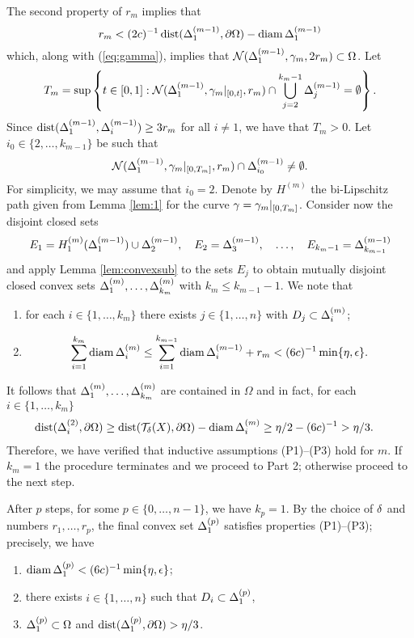 \documentclass{amsart}
\DeclareMathOperator{\dist}{dist}
\begin{document}
The second property of $r_m$ implies that 
\[ r_m <(2c)^{-1}\dist(\D^{(m-1)}_{1},\partial\Omega) - \diam{\D^{(m-1)}_{1}}\]
which, along with (\ref{eq:gamma}), implies that $\mathcal{N}(\Delta_{1}^{(m-1)},\gamma_m,2r_m) \subset \Omega$. 
Let
\[T_m = \sup\left \{ t \in [0,1] : \mathcal{N}(\Delta_{1}^{(m-1)},\gamma_m|_{[0,t]},r_m) \cap \bigcup_{j =2}^{k_m-1} \Delta_j^{(m-1)} = \emptyset \right \}. \]
Since $\dist(\D_1^{(m-1)},\D_i^{(m-1)}) \geq 3r_m$ for all $i\neq 1$, we have that $T_m>0$. Let $i_0 \in \{2,\dots,k_{m-1}\}$ be such that 
\[ \mathcal{N}(\Delta_{1}^{(m-1)},\gamma_m|_{[0,T_m]},r_m) \cap \Delta_{i_0}^{(m-1)} \neq \emptyset.\]
For simplicity, we may assume that $i_0=2$. Denote by $H^{(m)}$ the bi-Lipschitz path given from Lemma \ref{lem:1} for the curve $\gamma = \gamma_m|_{[0,T_m]}$. Consider now the disjoint closed sets  
\[ E_1 = H_1^{(m)}(\Delta^{(m-1)}_{1})\cup \Delta^{(m-1)}_{2}, \quad E_{2} = \Delta^{(m-1)}_{3}, \quad \dots, \quad E_{k_m-1} = \Delta^{(m-1)}_{k_{m-1}}\]
and apply Lemma \ref{lem:convexsub} to the sets $E_j$ to obtain mutually disjoint closed convex sets $\Delta^{(m)}_1,\dots,\Delta^{(m)}_{k_{m}}$ with $k_{m} \leq k_{m-1}-1$. We note that 
\begin{enumerate}
\item for each $i\in \{1,\dots,k_{m}\}$ there exists $j\in\{1,\dots,n\}$ with $D_{j} \subset \Delta^{(m)}_{i}$;
\item \[ \sum_{i=1}^{k_{m}} \operatorname{diam}{\Delta^{(m)}_{i}} \leq  \sum_{i=1}^{k_{m-1}} \operatorname{diam}{\Delta^{(m-1)}_{i}} + r_m < (6c)^{-1}\min\{\eta,\epsilon\}.\]
\end{enumerate}
It follows that $\Delta_1^{(m)},\dots,\Delta_{k_{m}}^{(m)}$ are contained in $\Omega$ and in fact, for each $i\in\{1,\dots,k_{m}\}$
\begin{align*} 
\dist(\D_i^{(2)},\partial\Omega) \geq \dist(\mathcal{T}_{\d}(X),\partial\Omega) - \diam{\D_i^{(m)}} &\geq \eta/2 - (6c)^{-1} > \eta/3.
\end{align*}
Therefore, we have verified that inductive assumptions (P1)--(P3) hold for $m$. If $k_{m} = 1$ the procedure terminates and we proceed to Part 2; otherwise proceed to the next step.


\medskip


After $p$ steps, for some $p \in \{ 0,\dots,n-1\}$, we have $k_{p}=1$. By the choice of $\delta$ and numbers $r_1,\dots,r_p$, the final convex set $\Delta^{(p)}_1$ satisfies properties (P1)--(P3); precisely, we have
\begin{enumerate}
\item $\operatorname{diam}{\Delta^{(p)}_1} < (6c)^{-1}\min\{\eta,\epsilon\}$;
\item there exists $i\in\{1,\dots,n\}$ such that $D_i \subset \Delta^{(p)}_1$,
\item $\Delta^{(p)}_1 \subset\Omega$ and $\dist(\D^{(p)}_1,\partial\Omega) > \eta/3$.
\end{enumerate}
\end{document}
